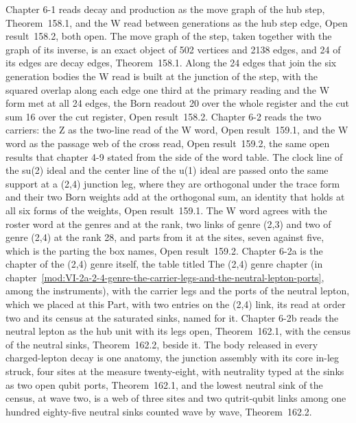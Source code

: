 Chapter 6-1 reads decay and production as the move graph of the hub step, Theorem~158.1, and the W read between generations as the hub step edge, Open result~158.2, both open. The move graph of the step, taken together with the graph of its inverse, is an exact object of 502 vertices and 2138 edges, and 24 of its edges are decay edges, Theorem~158.1. Along the 24 edges that join the six generation bodies the W read is built at the junction of the step, with the squared overlap along each edge one third at the primary reading and the W form met at all 24 edges, the Born readout 20 over the whole register and the cut sum 16 over the cut register, Open result~158.2. Chapter 6-2 reads the two carriers: the Z as the two-line read of the W word, Open result~159.1, and the W word as the passage web of the cross read, Open result~159.2, the same open results that chapter 4-9 stated from the side of the word table. The clock line of the su(2) ideal and the center line of the u(1) ideal are passed onto the same support at a (2,4) junction leg, where they are orthogonal under the trace form and their two Born weights add at the orthogonal sum, an identity that holds at all six forms of the weights, Open result~159.1. The W word agrees with the roster word at the genres and at the rank, two links of genre (2,3) and two of genre (2,4) at the rank 28, and parts from it at the sites, seven against five, which is the parting the box names, Open result~159.2. Chapter 6-2a is the chapter of the (2,4) genre itself, the table titled The (2,4) genre chapter (in chapter~\ref{mod:VI-2a-2-4-genre-the-carrier-legs-and-the-neutral-lepton-ports}, among the instruments), with the carrier legs and the ports of the neutral lepton, which we placed at this Part, with two entries on the (2,4) link, its read at order two and its census at the saturated sinks, named for it. Chapter 6-2b reads the neutral lepton as the hub unit with its legs open, Theorem~162.1, with the census of the neutral sinks, Theorem~162.2, beside it. The body released in every charged-lepton decay is one anatomy, the junction assembly with its core in-leg struck, four sites at the measure twenty-eight, with neutrality typed at the sinks as two open qubit ports, Theorem~162.1, and the lowest neutral sink of the census, at wave two, is a web of three sites and two qutrit-qubit links among one hundred eighty-five neutral sinks counted wave by wave, Theorem~162.2.

